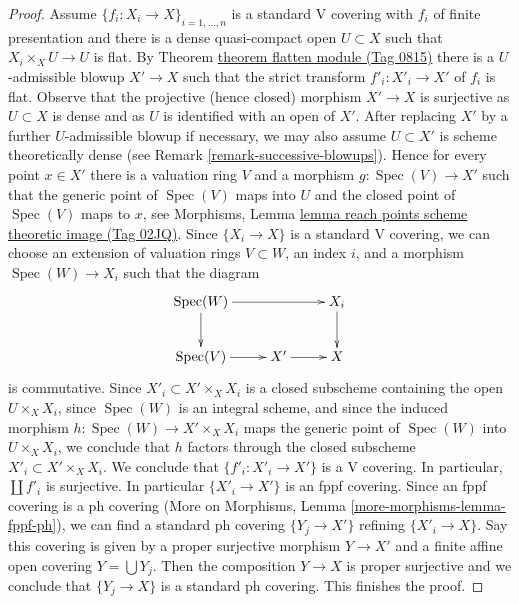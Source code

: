 \documentclass{amsart}
\theoremstyle{plain}
\theoremstyle{definition}
\theoremstyle{remark}
\numberwithin{equation}{subsection}
\def\Spec{\mathop{\mathrm{Spec}}}
\begin{document}
\begin{proof}
\medskip\noindent
Assume $\{f_i : X_i \to X\}_{i = 1, \ldots, n}$ is a standard V covering
with $f_i$ of finite presentation and there is a dense quasi-compact open
$U \subset X$ such that $X_i \times_X U \to U$ is flat.
By Theorem \href{https://stacks.math.columbia.edu/tag/0815}{theorem flatten module (Tag 0815)}
there is a $U$-admissible blowup $X' \to X$ such that
the strict transform $f'_i : X'_i \to X'$ of $f_i$ is flat.
Observe that the projective (hence closed) morphism $X' \to X$
is surjective as $U \subset X$ is dense and as $U$ is identified
with an open of $X'$. After replacing $X'$ by a further
$U$-admissible blowup if necessary,
we may also assume $U \subset X'$ is scheme theoretically dense
(see Remark \ref{remark-successive-blowups}).
Hence for every point $x \in X'$ there is a valuation ring $V$
and a morphism $g : \Spec(V) \to X'$ such that the generic
point of $\Spec(V)$ maps into $U$ and the closed point of
$\Spec(V)$ maps to $x$, see Morphisms, Lemma
\href{https://stacks.math.columbia.edu/tag/02JQ}{lemma reach points scheme theoretic image (Tag 02JQ)}.
Since $\{X_i \to X\}$ is a standard V covering, we can choose
an extension of valuation rings $V \subset W$, an index $i$, and a morphism
$\Spec(W) \to X_i$ such that the diagram
$$
\xymatrix{
\Spec(W) \ar[d] \ar[rr] & & X_i \ar[d] \\
\Spec(V) \ar[r] & X' \ar[r] & X
}
$$
is commutative. Since $X'_i \subset X' \times_X X_i$ is a closed subscheme
containing the open $U \times_X X_i$, since $\Spec(W)$ is an integral scheme,
and since the induced morphism $h : \Spec(W) \to X' \times_X X_i$ maps
the generic point of $\Spec(W)$ into $U \times_X X_i$, we conclude
that $h$ factors through the closed subscheme $X'_i \subset X' \times_X X_i$.
We conclude that $\{f'_i : X'_i \to X'\}$ is a V covering.
In particular, $\coprod f'_i$ is surjective. In particular
$\{X'_i \to X'\}$ is an fppf covering. Since an fppf covering is a ph covering
(More on Morphisms, Lemma \ref{more-morphisms-lemma-fppf-ph}),
we can find a standard ph covering $\{Y_j \to X'\}$ refining
$\{X'_i \to X\}$. Say this covering is given by a proper surjective
morphism $Y \to X'$ and a finite affine open covering
$Y = \bigcup Y_j$. Then the composition $Y \to X$ is proper surjective
and we conclude that $\{Y_j \to X\}$ is a standard ph covering.
This finishes the proof.
\end{proof}
\end{document}
